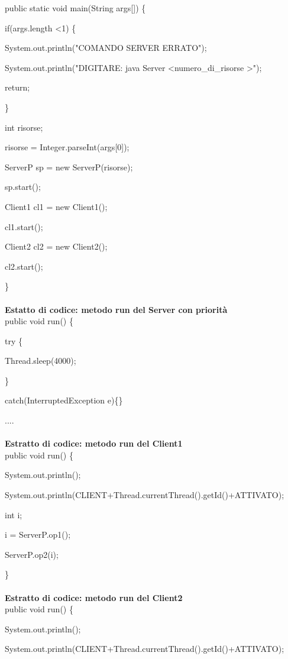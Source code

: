 \documentclass[10pt, a4paper]{article}
\begin{document}
public static void main(String args[]) \{

        if(args.length \textless 1) \{

            System.out.println("COMANDO SERVER ERRATO");

            System.out.println("DIGITARE: java Server \textless numero\_di\_risorse \textgreater");

            return;

        \}

        int risorse;

        risorse = Integer.parseInt(args[0]);

        ServerP sp = new ServerP(risorse);

        sp.start();

	Client1 cl1 = new Client1();

	cl1.start();

	Client2 cl2 = new Client2();

	cl2.start();

\}
\\\\
\textbf{Estatto di codice: metodo run del Server con priorità}
\\

public void run() \{

try \{ 

		Thread.sleep(4000);

	\}

	catch(InterruptedException e)\{\}

.... 
\\\\
\textbf{Estratto di codice: metodo run del Client1}
\\

public void run() \{

		System.out.println();

        	System.out.println(CLIENT+Thread.currentThread().getId()+ATTIVATO);

		int i;

		i = ServerP.op1();

		ServerP.op2(i);

\}
\\\\
\textbf{Estratto di codice: metodo run del Client2}
\\

public void run() \{

		System.out.println();

        	System.out.println(CLIENT+Thread.currentThread().getId()+ATTIVATO);
\end{document}
